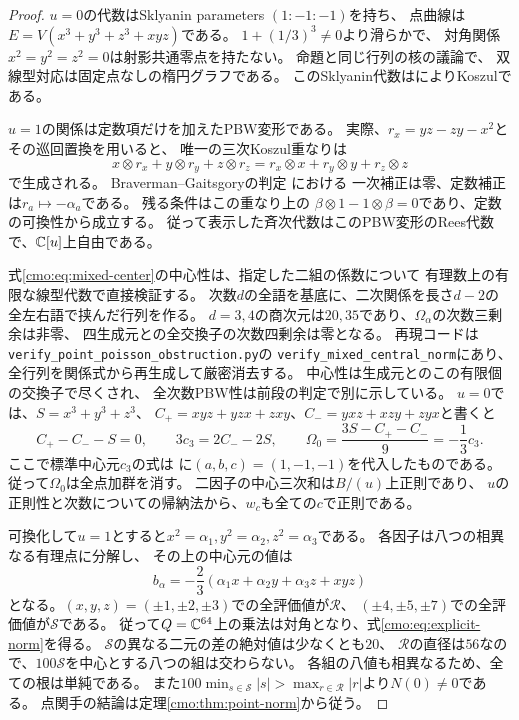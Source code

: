 \begin{proof}
$u=0$の代数はSklyanin parameters $(1:-1:-1)$を持ち、
点曲線は$E=V(x^3+y^3+z^3+xyz)$である。
$1+(1/3)^3\ne0$より滑らかで、
対角関係$x^2=y^2=z^2=0$は射影共通零点を持たない。
命題と同じ行列の核の議論で、
双線型対応は固定点なしの楕円グラフである。
このSklyanin代数は\cite[Theorem~1.1, Corollary~1.3]{GRSklyaninTV}によりKoszulである。

$u=1$の関係は定数項だけを加えたPBW変形である。
実際、$r_x=yz-zy-x^2$とその巡回置換を用いると、
唯一の三次Koszul重なりは
\[
 x\otimes r_x+y\otimes r_y+z\otimes r_z
   =r_x\otimes x+r_y\otimes y+r_z\otimes z
\]
で生成される。
Braverman--Gaitsgoryの判定
\cite[Main Theorem~0.5, Lemma~3.3]{CMOBravermanGaitsgory}における
一次補正は零、定数補正は$r_a\mapsto-\alpha_a$である。
残る条件はこの重なり上の
$\beta\otimes1-1\otimes\beta=0$であり、定数の可換性から成立する。
従って表示した斉次代数はこのPBW変形のRees代数で、$\mathbb C[u]$上自由である。

式\eqref{cmo:eq:mixed-center}の中心性は、指定した二組の係数について
有理数上の有限な線型代数で直接検証する。
次数$d$の全語を基底に、二次関係を長さ$d-2$の全左右語で挟んだ行列を作る。
$d=3,4$の商次元は$20,35$であり、$\Omega_\alpha$の次数三剰余は非零、
四生成元との全交換子の次数四剰余は零となる。
再現コードは\texttt{verify\_point\_poisson\_obstruction.py}の
\texttt{verify\_mixed\_central\_norm}にあり、全行列を関係式から再生成して厳密消去する。
中心性は生成元とのこの有限個の交換子で尽くされ、
全次数PBW性は前段の判定で別に示している。
$u=0$では、$S=x^3+y^3+z^3$、
$C_+=xyz+yzx+zxy$、$C_-=yxz+xzy+zyx$と書くと
\[
 C_+-C_--S=0,\qquad 3c_3=2C_--2S,\qquad
 \Omega_0=\frac{3S-C_+-C_-}{9}=-\frac13c_3.
\]
ここで標準中心元$c_3$の式は
\cite[Section~2, p.~3]{GRSklyaninDLL}に$(a,b,c)=(1,-1,-1)$を代入したものである。
従って$\Omega_0$は全点加群を消す。
二因子の中心三次和は$B/(u)$上正則であり、
$u$の正則性と次数についての帰納法から、$w_c$も全ての$c$で正則である。

可換化して$u=1$とすると$x^2=\alpha_1,y^2=\alpha_2,z^2=\alpha_3$である。
各因子は八つの相異なる有理点に分解し、
その上の中心元の値は
\[
 b_\alpha=-\frac23(\alpha_1x+\alpha_2y+\alpha_3z+xyz)
\]
となる。$(x,y,z)=(\pm1,\pm2,\pm3)$での全評価値が$\mathcal R$、
$(\pm4,\pm5,\pm7)$での全評価値が$\mathcal S$である。
従って$Q=\mathbb C^{64}$上の乗法は対角となり、式\eqref{cmo:eq:explicit-norm}を得る。
$\mathcal S$の異なる二元の差の絶対値は少なくとも$20$、
$\mathcal R$の直径は$56$なので、$100\mathcal S$を中心とする八つの組は交わらない。
各組の八値も相異なるため、全ての根は単純である。
また$100\min_{s\in\mathcal S}|s|>\max_{r\in\mathcal R}|r|$より$N(0)\ne0$である。
点関手の結論は定理\ref{cmo:thm:point-norm}から従う。
\end{proof}


